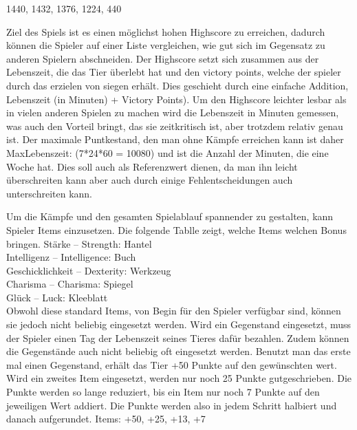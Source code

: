 1440, 1432, 1376, 1224, 440

Ziel des Spiels ist es einen möglichst hohen Highscore zu erreichen, dadurch können die Spieler auf einer Liste vergleichen, wie gut sich im Gegensatz zu anderen Spielern abschneiden. Der Highscore setzt sich zusammen aus der Lebenszeit, die das Tier überlebt hat und den victory points, welche der spieler durch das erzielen von siegen erhält. Dies geschieht durch eine einfache Addition, Lebenszeit (in Minuten) + Victory Points).
Um den Highscore leichter lesbar als in vielen anderen Spielen zu machen wird die Lebenszeit in Minuten gemessen, was auch den Vorteil bringt, das sie zeitkritisch ist, aber trotzdem relativ genau ist.
Der maximale Puntkestand, den man ohne Kämpfe erreichen kann ist daher MaxLebenszeit: (7*24*60 = 10080) und ist die Anzahl der Minuten, die eine Woche hat. 
Dies soll auch als Referenzwert dienen, da man ihn leicht überschreiten kann aber auch durch einige Fehlentscheidungen auch unterschreiten kann.

Um die Kämpfe und den gesamten Spielablauf spannender zu gestalten, kann Spieler Items einzusetzen. 
Die folgende Tablle zeigt, welche Items welchen Bonus bringen.
Stärke – Strength:		Hantel\\
Intelligenz – Intelligence: 		Buch\\
Geschicklichkeit – Dexterity:	Werkzeug\\
Charisma – Charisma:		Spiegel\\
Glück – Luck:				Kleeblatt \\
Obwohl diese standard Items, von Begin für den Spieler verfügbar sind, können sie jedoch nicht beliebig eingesetzt werden. Wird ein Gegenstand eingesetzt, muss der Spieler einen Tag der Lebenszeit seines Tieres dafür bezahlen. Zudem können die Gegenstände auch nicht beliebig oft eingesetzt werden. Benutzt man das erste mal einen Gegenstand, erhält das Tier +50 Punkte auf den gewünschten wert. Wird ein zweites Item eingesetzt, werden nur noch 25 Punkte gutgeschrieben. Die Punkte werden so lange reduziert, bis ein Item nur noch 7 Punkte auf den jeweiligen Wert addiert. Die Punkte werden also in jedem Schritt halbiert und danach aufgerundet. 
Items: +50,  +25, +13, +7

